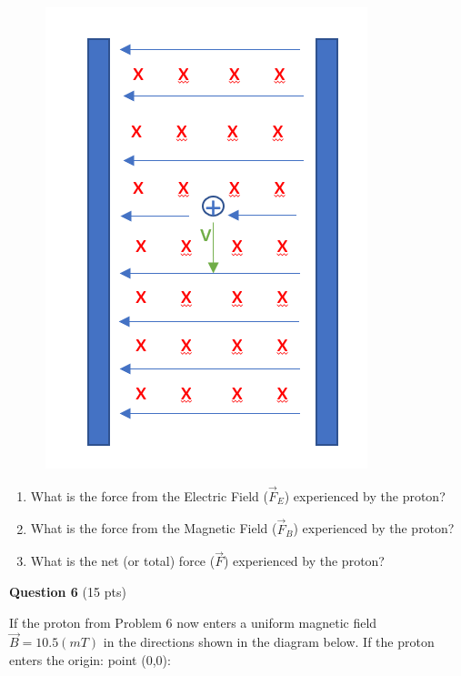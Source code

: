 \documentclass[14pt]{report}
\begin{document}
\begin{figure}[H]
\begin{center}
\includegraphics[scale=0.25]{final_4b.png}
\end{center}
\end{figure}

\begin{enumerate}[label=\Alph*]
\item What is the force from the Electric Field ($\vec{F}_E$) experienced by the proton?
\item What is the force from the Magnetic Field ($\vec{F}_B$) experienced by the proton?
\item What is the net (or total) force ($\vec{F}$) experienced by the proton?
\end{enumerate}

\newpage
\textbf{Question 6} (15 pts)

If the proton from Problem 6 now enters a uniform magnetic field $\vec{B} = 10.5 (mT)$ in the directions shown in the diagram below. If the proton enters the origin: point (0,0):
\end{document}
